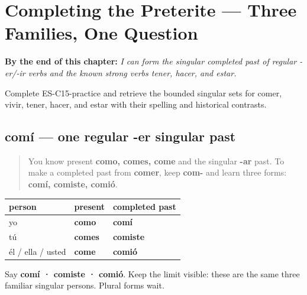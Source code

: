
\chapter{Completing the Preterite --- Three Families, One Question}
\label{ch:completing-preterite}

\begin{chapteropening}
\textbf{By the end of this chapter:} \emph{I can form the singular completed past of regular -er/-ir verbs and the known strong verbs tener, hacer, and estar.}

Complete ES-C15-practice and retrieve the bounded singular sets for comer, vivir, tener, hacer, and estar with their spelling and historical contrasts.
\end{chapteropening}

\section[comí]{comí — one regular -er singular past}

\label{lesson:ES-C15-comer-preterite}



\begin{quote}
You know present \textbf{como, comes, come} and the singular \textbf{-ar} past. To make a completed past from \textbf{comer}, keep \textbf{com-} and learn three forms: \textbf{comí, comiste, comió}.
\end{quote}

\begin{grammarlens}[title={Grammar Lens: present beside completed past}]
\noindent
\begin{tabularx}{\linewidth}{@{}>{\raggedright\arraybackslash}X>{\raggedright\arraybackslash}X>{\raggedright\arraybackslash}X@{}}
\toprule
\textbf{person} & \textbf{present} & \textbf{completed past} \\
\midrule
yo & \textbf{como} & \textbf{comí} \\
tú & \textbf{comes} & \textbf{comiste} \\
él / ella / usted & \textbf{come} & \textbf{comió} \\
\bottomrule
\end{tabularx}

Say \textbf{comí · comiste · comió}. Keep the limit visible: these are the same three familiar singular persons. Plural forms wait.
\end{grammarlens}

